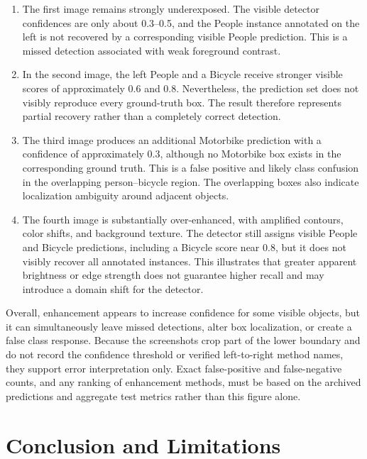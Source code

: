 \documentclass[11pt,a4paper]{article}
\begin{document}
\begin{enumerate}[label=\textbf{Panel \arabic*:}, leftmargin=*]
    \item The first image remains strongly underexposed. The visible detector
    confidences are only about 0.3--0.5, and the People instance annotated on
    the left is not recovered by a corresponding visible People prediction.
    This is a missed detection associated with weak foreground contrast.

    \item In the second image, the left People and a Bicycle receive stronger
    visible scores of approximately 0.6 and 0.8. Nevertheless, the prediction
    set does not visibly reproduce every ground-truth box. The result therefore
    represents partial recovery rather than a completely correct detection.

    \item The third image produces an additional Motorbike prediction with a
    confidence of approximately 0.3, although no Motorbike box exists in the
    corresponding ground truth. This is a false positive and likely class
    confusion in the overlapping person--bicycle region. The overlapping boxes
    also indicate localization ambiguity around adjacent objects.

    \item The fourth image is substantially over-enhanced, with amplified
    contours, color shifts, and background texture. The detector still assigns
    visible People and Bicycle predictions, including a Bicycle score near 0.8,
    but it does not visibly recover all annotated instances. This illustrates
    that greater apparent brightness or edge strength does not guarantee higher
    recall and may introduce a domain shift for the detector.
\end{enumerate}

Overall, enhancement appears to increase confidence for some visible objects,
but it can simultaneously leave missed detections, alter box localization, or
create a false class response. Because the screenshots crop part of the lower
boundary and do not record the confidence threshold or verified left-to-right
method names, they support error interpretation only. Exact false-positive and
false-negative counts, and any ranking of enhancement methods, must be based on
the archived predictions and aggregate test metrics rather than this figure
alone.

\section{Conclusion and Limitations}
\end{document}
